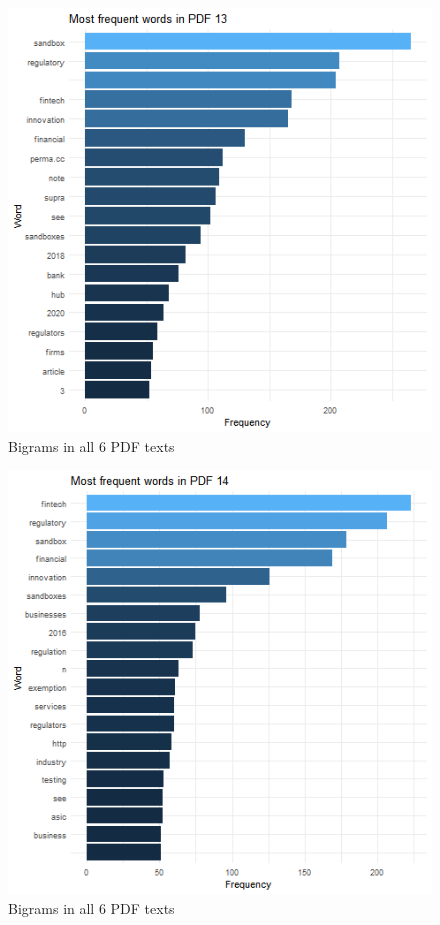 \documentclass[
]{book}
\begin{document}
\begin{figure}

{\centering \includegraphics[width=0.8\linewidth]{img/freqP13} 

}

\caption{Bigrams in all 6 PDF texts}\label{fig:nice-figF7-16-7}
\end{figure}
\begin{figure}

{\centering \includegraphics[width=0.8\linewidth]{img/freqP14} 

}

\caption{Bigrams in all 6 PDF texts}\label{fig:nice-figF7-16-8}
\end{figure}
\end{document}
